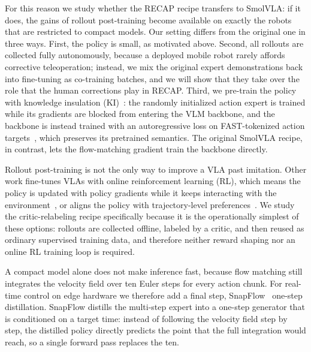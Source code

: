 \documentclass[conference]{IEEEtran}
\begin{document}
For this reason we study whether the RECAP recipe transfers to SmolVLA: if it does, the
gains of rollout post-training become available on exactly the robots that are restricted
to compact models. Our setting differs from the original one in three ways. First, the
policy is small, as motivated above. Second, all rollouts are collected fully autonomously,
because a deployed mobile robot rarely affords corrective teleoperation; instead, we mix
the original expert demonstrations back into fine-tuning as co-training batches, and we
will show that they take over the role that the human corrections play in RECAP. Third, we
pre-train the policy with knowledge insulation (KI)~\cite{b_ki}: the randomly initialized
action expert is trained while its gradients are blocked from entering the VLM backbone,
and the backbone is instead trained with an autoregressive loss on FAST-tokenized action
targets~\cite{b_fast}, which preserves its pretrained semantics. The original SmolVLA
recipe, in contrast, lets the flow-matching gradient train the backbone directly.

Rollout post-training is not the only way to improve a VLA past imitation. Other work
fine-tunes VLAs with online reinforcement learning (RL), which means the policy is updated
with policy gradients while it keeps interacting with the
environment~\cite{b_irevla,b_simplevlarl}, or aligns the policy with trajectory-level
preferences~\cite{b_grape}. We study the critic-relabeling recipe specifically because it
is the operationally simplest of these options: rollouts are collected offline, labeled by
a critic, and then reused as ordinary supervised training data, and therefore neither
reward shaping nor an online RL training loop is required.

A compact model alone does not make inference fast, because flow matching still integrates
the velocity field over ten Euler steps for every action chunk. For real-time control on
edge hardware we therefore add a final step, SnapFlow~\cite{b_snapflow} one-step
distillation. SnapFlow distills the multi-step expert into a one-step generator that is
conditioned on a target time: instead of following the velocity field step by step, the
distilled policy directly predicts the point that the full integration would reach, so a
single forward pass replaces the ten.
\end{document}
